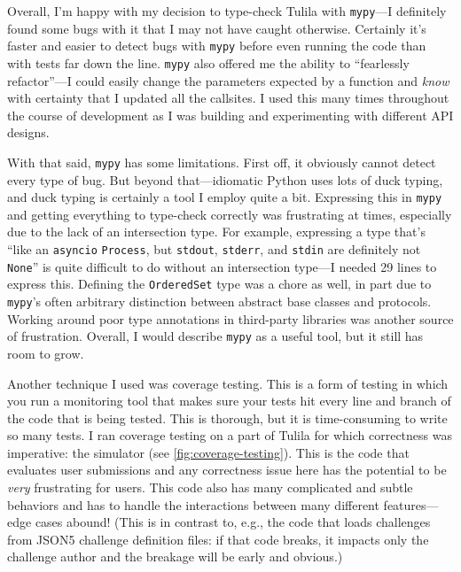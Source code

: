 \documentclass[12pt]{article}
\begin{document}
Overall, I'm happy with my decision to type-check Tulila with \texttt{mypy}---I definitely found some bugs with it that I may not have caught otherwise. Certainly it's faster and easier to detect bugs with \texttt{mypy} before even running the code than with tests far down the line. \texttt{mypy} also offered me the ability to ``fearlessly refactor''---I could easily change the parameters expected by a function and \textit{know} with certainty that I updated all the callsites. I used this many times throughout the course of development as I was building and experimenting with different API designs.

With that said, \texttt{mypy} has some limitations. First off, it obviously cannot detect every type of bug. But beyond that---idiomatic Python uses lots of duck typing, and duck typing is certainly a tool I employ quite a bit. Expressing this in \texttt{mypy} and getting everything to type-check correctly was frustrating at times, especially due to the lack of an intersection type. For example, expressing a type that's ``like an \texttt{asyncio} \texttt{Process}, but \texttt{stdout}, \texttt{stderr}, and \texttt{stdin} are definitely not \texttt{None}'' is quite difficult to do without an intersection type---I needed 29 lines to express this. Defining the \texttt{OrderedSet} type was a chore as well, in part due to \texttt{mypy}'s often arbitrary distinction between abstract base classes and protocols. Working around poor type annotations in third-party libraries was another source of frustration. Overall, I would describe \texttt{mypy} as a useful tool, but it still has room to grow.

Another technique I used was coverage testing. This is a form of testing in which you run a monitoring tool that makes sure your tests hit every line and branch of the code that is being tested. This is thorough, but it is time-consuming to write so many tests. I ran coverage testing on a part of Tulila for which correctness was imperative: the simulator (see \cref{fig:coverage-testing}). This is the code that evaluates user submissions and any correctness issue here has the potential to be \textit{very} frustrating for users. This code also has many complicated and subtle behaviors and has to handle the interactions between many different features---edge cases abound! (This is in contrast to, e.g., the code that loads challenges from JSON5 challenge definition files: if that code breaks, it impacts only the challenge author and the breakage will be early and obvious.)
\end{document}
